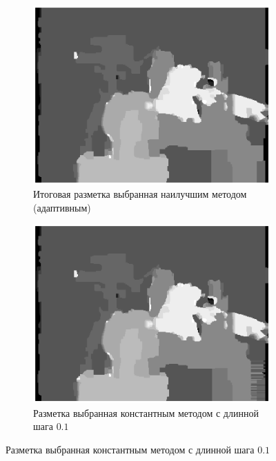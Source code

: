 \documentclass{article}
\begin{document}
\begin{figure}
    \centering
    \begin{subfigure}[t]{\textwidth}
            \centering
            \includegraphics[width=\textwidth]{adaptive_result.eps}
            \caption{Итоговая разметка выбранная наилучшим методом (адаптивным)}
    \end{subfigure}
    \begin{subfigure}[t]{\textwidth}
            \centering
            \includegraphics[width=\textwidth]{constant_0_1_result.eps}
            \caption{Разметка выбранная константным методом с длинной шага $0.1$}
    \end{subfigure}
\end{figure}
\end{document}
